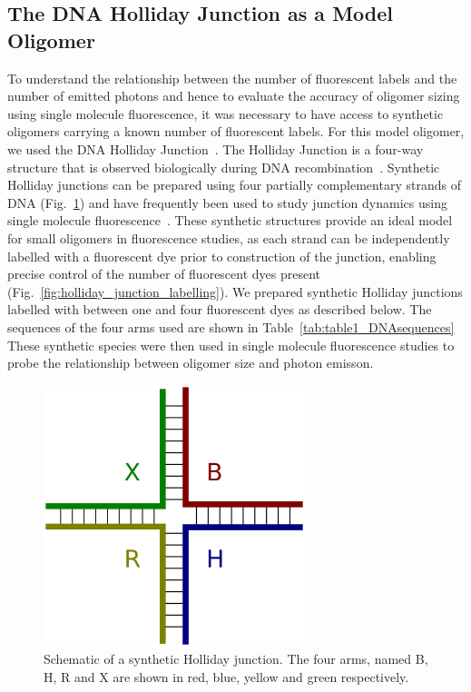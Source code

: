 

\subsection{The DNA Holliday Junction as a Model Oligomer}
To understand the relationship between the number of fluorescent labels and the number of emitted photons and hence to evaluate the accuracy of oligomer sizing using single molecule fluorescence, it was necessary to have access to synthetic oligomers carrying a known number of fluorescent labels. For this model oligomer, we used the DNA Holliday Junction~\cite{holliday1964}. The Holliday Junction is a four-way structure that is observed biologically during DNA recombination~\cite{potter1976}. Synthetic Holliday junctions can be prepared using four partially complementary strands of DNA (Fig.~\ref{fig:holliday_junction}) and have frequently been used to study junction dynamics using single molecule fluorescence~\cite{mckinney03, uphoff2010, Hyeon2012}. These synthetic structures provide an ideal model for small oligomers in fluorescence studies, as each strand can be independently labelled with a fluorescent dye prior to construction of the junction, enabling precise control of the number of fluorescent dyes present (Fig.~\ref{fig:holliday_junction_labelling}). We prepared synthetic Holliday junctions labelled with between one and four fluorescent dyes as described below. The sequences of the four arms used are shown in Table~\ref{tab:table1_DNAsequences} These synthetic species were then used in single molecule fluorescence studies to probe the relationship between oligomer size and photon emisson.

\begin{figure}
   \begin{center}
      \includegraphics*[clip=true, width=3in]{sizing/holliday_junction.pdf}
      \caption{Schematic of a synthetic Holliday junction. The four arms, named B, H, R and X are shown in red, blue, yellow and green respectively.}
      \label{fig:holliday_junction}
   \end{center}
\end{figure}

